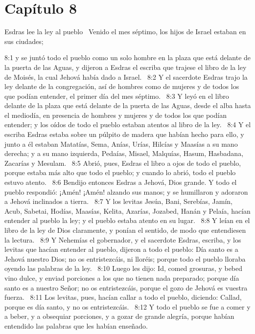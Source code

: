 \section*{Capítulo 8}
Esdras lee la ley al pueblo  
Venido el mes séptimo, los hijos de Israel estaban en sus ciudades;  

8:1 y se juntó todo el pueblo como un solo hombre en la plaza que está delante de la puerta de las Aguas, y dijeron a Esdras el escriba que trajese el libro de la ley de Moisés, la cual Jehová había dado a Israel.  
8:2 Y el sacerdote Esdras trajo la ley delante de la congregación, así de hombres como de mujeres y de todos los que podían entender, el primer día del mes séptimo.  
8:3 Y leyó en el libro delante de la plaza que está delante de la puerta de las Aguas, desde el alba hasta el mediodía, en presencia de hombres y mujeres y de todos los que podían entender; y los oídos de todo el pueblo estaban atentos al libro de la ley.  
8:4 Y el escriba Esdras estaba sobre un púlpito de madera que habían hecho para ello, y junto a él estaban Matatías, Sema, Anías, Urías, Hilcías y Maasías a su mano derecha; y a su mano izquierda, Pedaías, Misael, Malquías, Hasum, Hasbadana, Zacarías y Mesulam.  
8:5 Abrió, pues, Esdras el libro a ojos de todo el pueblo, porque estaba más alto que todo el pueblo; y cuando lo abrió, todo el pueblo estuvo atento.  
8:6 Bendijo entonces Esdras a Jehová, Dios grande. Y todo el pueblo respondió: ¡Amén! ¡Amén! alzando sus manos; y se humillaron y adoraron a Jehová inclinados a tierra.  
8:7 Y los levitas Jesúa, Bani, Serebías, Jamín, Acub, Sabetai, Hodías, Maasías, Kelita, Azarías, Jozabed, Hanán y Pelaía, hacían entender al pueblo la ley; y el pueblo estaba atento en su lugar.  
8:8 Y leían en el libro de la ley de Dios claramente, y ponían el sentido, de modo que entendiesen la lectura.  
8:9 Y Nehemías el gobernador, y el sacerdote Esdras, escriba, y los levitas que hacían entender al pueblo, dijeron a todo el pueblo: Día santo es a Jehová nuestro Dios; no os entristezcáis, ni lloréis; porque todo el pueblo lloraba oyendo las palabras de la ley.  
8:10 Luego les dijo: Id, comed grosuras, y bebed vino dulce, y enviad porciones a los que no tienen nada preparado; porque día santo es a nuestro Señor; no os entristezcáis, porque el gozo de Jehová es vuestra fuerza.  
8:11 Los levitas, pues, hacían callar a todo el pueblo, diciendo: Callad, porque es día santo, y no os entristezcáis.  
8:12 Y todo el pueblo se fue a comer y a beber, y a obsequiar porciones, y a gozar de grande alegría, porque habían entendido las palabras que les habían enseñado.  
